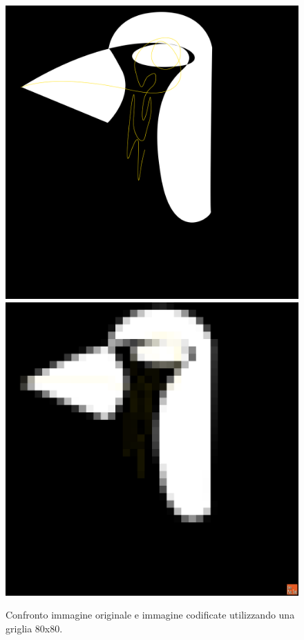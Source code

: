 \begin{figure}[htb] \centering
\includegraphics[scale=0.03]{Pictures/in ricordo del pinguino cameriere.png}
\qquad\qquad
\includegraphics[scale=0.03]{Pictures/canvas80x80.png}
\caption{Confronto immagine originale e immagine codificate utilizzando una griglia 80x80.}\label{fig:figura}
\end{figure}

